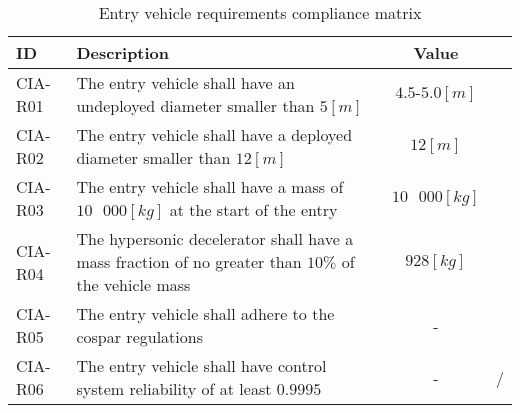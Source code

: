 \begin{table}[H]
\centering
	\caption{Entry vehicle requirements compliance matrix} 
	\label{tab:compv}
	\begin{tabular}{|p{}|p{}|c|c|}
	    \hline
	    ID          & Description   & Value &                                                                                           \\ \hline \hline
	CIA-R01 & The entry vehicle shall have an undeployed diameter smaller than $5 \left[m\right]$                   & $4.5\mbox{-}5.0 \left[m\right]$  & \cmark     				            \\ \hline
	CIA-R02 & The entry vehicle shall have a deployed diameter smaller than $12 \left[m\right]$                     & $12 \left[m\right]$ &  \cmark 				            \\ \hline	
	CIA-R03 & The entry vehicle shall have a mass of $10\mbox{ }000 \left[kg\right]$ at the start of the entry           & $10\mbox{ }000 \left[kg\right]$ &  \cmark          				            \\ \hline
	CIA-R04 & The hypersonic decelerator shall have a mass fraction of no greater than $10\%$ of the vehicle mass	& $928 \left[kg\right]$ & \cmark \\ \hline 
	CIA-R05 &  The entry vehicle shall adhere to the \gls{cospar} regulations  & - & \cmark \\ \hline
	CIA-R06 &  The entry vehicle shall have control system reliability of at least $0.9995$ & - & \cmark /\xmark\\ \hline
    \end{tabular}
\end{table}

\newpage
